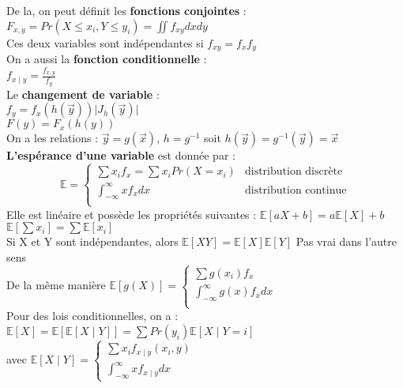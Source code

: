 \documentclass[../main.tex]{subfiles}
\begin{document}
De la, on peut définit les \textbf{fonctions conjointes} : \\
$F_{x,y} = Pr(X\leq x_i, Y\leq y_i) = \iint f_{xy} dxdy$\\
Ces deux variables sont indépendantes si $f_{xy} = f_xf_y$\\
On a aussi la \textbf{fonction conditionnelle} :\\
$f_{x\mid y} = \frac{f_{x,y}}{f_y}$\\

Le \textbf{changement de variable} : \\
$f_y = f_x(h(\vec{y})) \lvert J_h(\vec{y})\rvert$\\
$F(y) = F_x(h(y))$\\
On a les relations : $\vec{y} = g(\vec{x})$, $h = g^{-1}$ soit $h(\vec{y}) = g^{-1}(\vec{y}) = \vec{x}$\\


\textbf{L'espérance d'une variable} est donnée par : \\
\begin{equation}
    \mathbb{E} = \left\{
    \begin{array}{cc}
        \sum x_if_x = \sum x_i Pr(X=x_i) & \textrm{distribution discrète} \\
        \int_{-\infty}^{\infty}xf_xdx & \textrm{distribution continue}\\
    \end{array}
    \right.
\end{equation}
Elle est linéaire et possède les propriétés suivantes : $\mathbb{E}[aX+b] = a\mathbb{E}[X] +b$\\
$\mathbb{E}[\sum x_i] = \sum \mathbb{E}[x_i]$\\
Si X et Y sont indépendantes, alors $\mathbb{E}[XY] = \mathbb{E}[X]\mathbb{E}[Y]$ \warning Pas vrai dans l'autre sens\\

De la même manière $\mathbb{E}[g(X)] = \left\{\begin{array}{c}
    \sum g(x_i) f_x\\
    \int_{-\infty}^{\infty} g(x)f_xdx\\
\end{array}\right.$\\

Pour des lois conditionnelles, on a : \\
$\mathbb{E}[X] = \mathbb{E}[\mathbb{E}[X\mid Y]] = \sum Pr(y_i)\mathbb{E}[X\mid Y=i]$\\
avec $\mathbb{E}[X\mid Y] = \left\{\begin{array}{c}
    \sum x_i f_{x\mid y}(x_i, y) \\
    \int_{-\infty}^{\infty}xf_{x\mid y} dx 
\end{array}\right.$
\end{document}

